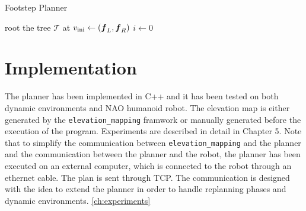 \begin{algorithm}
  \caption{Footstep Planner}
  \label{alg:footstep-planner}
  root the tree $\mathcal{T}$ at $v_{\rm ini} \leftarrow ({\mbox{\boldmath $f$}}_L, {\mbox{\boldmath $f$}}_R)$\;
  $i \leftarrow 0$\;
\end{algorithm}

\section{Implementation}
The planner has been implemented in C++ and it has been tested on both dynamic 
environments and NAO humanoid robot. The elevation map is either
generated by the 
\texttt{elevation\_mapping} framwork or manually generated before the execution 
of the program. Experiments are described in detail in Chapter 5. Note that to 
simplify the communication between \texttt{elevation\_mapping} and the planner 
and the communication between the planner and the robot, the planner has been 
executed on an external computer, which is connected to the robot through 
an ethernet cable. The plan is sent through TCP. The communication is designed 
with the idea to extend the planner in order to handle replanning phases and
dynamic environments.
\ref{ch:experiments} 
